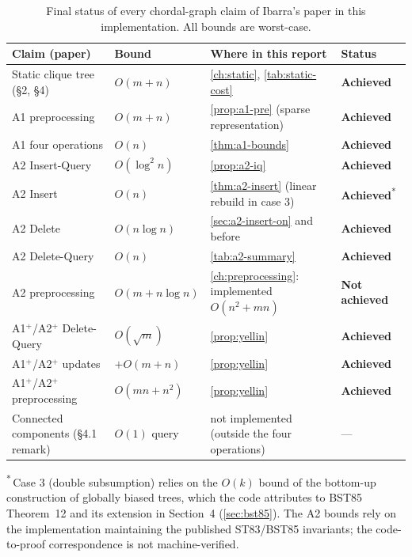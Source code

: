 \documentclass[11pt,a4paper,oneside]{report}
\theoremstyle{plain}
\theoremstyle{definition}
\theoremstyle{remark}
\newcommand{\op}[1]{\textsf{#1}}
\newcommand{\ok}{\textcolor{okgreen}{\textbf{Achieved}}}
\newcommand{\notok}{\textcolor{badred}{\textbf{Not achieved}}}
\begin{document}
\begin{table}[ht]
\centering\small
\caption[Final status of every chordal-graph claim of the paper]{Final status of every
chordal-graph claim of Ibarra's paper in this implementation. All bounds are worst-case.}\label{tab:final-status}
\begin{tabularx}{\textwidth}{@{}>{\raggedright\arraybackslash}p{3.3cm}lX>{\raggedright\arraybackslash}p{2.3cm}@{}}
\toprule
\textbf{Claim (paper)} & \textbf{Bound} & \textbf{Where in this report} & \textbf{Status}\\
\midrule
Static clique tree (\S2, \S4) & \(O(m+n)\) & \cref{ch:static}, \cref{tab:static-cost} & \ok\\
A1 preprocessing & \(O(m+n)\) & \cref{prop:a1-pre} (sparse representation) & \ok\\
A1 four operations & \(O(n)\) & \cref{thm:a1-bounds} & \ok\\
A2 \op{Insert-Query} & \(O(\log^2 n)\) & \cref{prop:a2-iq} & \ok\\
A2 \op{Insert} & \(O(n)\) & \cref{thm:a2-insert} (linear rebuild in case 3) & \ok\textsuperscript{*}\\
A2 \op{Delete} & \(O(n\log n)\) & \cref{sec:a2-insert-on} and before & \ok\\
A2 \op{Delete-Query} & \(O(n)\) & \cref{tab:a2-summary} & \ok\\
A2 preprocessing & \(O(m+n\log n)\) & \cref{ch:preprocessing}: implemented \(O(n^2+mn)\) & \notok\\
A1\(^+\)/A2\(^+\) \op{Delete-Query} & \(O(\sqrt m)\) & \cref{prop:yellin} & \ok\\
A1\(^+\)/A2\(^+\) updates & \(+O(m+n)\) & \cref{prop:yellin} & \ok\\
A1\(^+\)/A2\(^+\) preprocessing & \(O(mn+n^2)\) & \cref{prop:yellin} & \ok\\
Connected components (\S4.1 remark) & \(O(1)\) query & not implemented (outside the four operations) & ---\\
\bottomrule
\end{tabularx}
\par\smallskip\raggedright\footnotesize\textsuperscript{*}\,Case 3 (double subsumption) relies on the
\(O(k)\) bound of the bottom-up construction of globally biased trees, which the code attributes
to BST85 Theorem~12 and its extension in Section~4 (\cref{sec:bst85}). The
A2 bounds rely on the implementation maintaining the published ST83/BST85 invariants;
the code-to-proof correspondence is not machine-verified.
\end{table}
\end{document}
